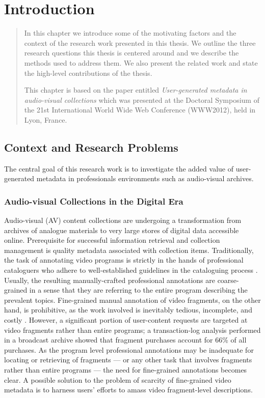 \chapter{Introduction}\label{chap:intro}

\begin{quotation}
\noindent 
In this chapter we introduce some of the motivating factors and the context of the research work presented in this thesis. We outline the three research questions this thesis is centered around and we describe the methods used to address them. We also present the related work and state the high-level contributions of the thesis.

This chapter is based on the paper entitled \textit{User-generated metadata in audio-visual collections} which was presented at the Doctoral Symposium of the 21st International World Wide Web Conference (WWW2012), held in Lyon, France.
\end{quotation}

\section{Context and Research Problems}
The central goal of this research work is to investigate the added value of user-generated metadata in professionals environments such as audio-visual archives. 
\subsection{Audio-visual Collections in the Digital Era}
Audio-visual (AV) content collections are undergoing a transformation from archives of analogue materials to very large stores of digital data accessible online. Prerequisite for successful information retrieval and collection management is quality metadata associated with collection items. Traditionally, the task of annotating video programs is strictly in the hands of professional cataloguers who adhere to well-established guidelines in the cataloguing process \cite{acrchivingphilosophy}. Usually, the resulting manually-crafted professional annotations are coarse-grained in a sense that they are referring to the entire program describing the prevalent topics. Fine-grained manual annotation of video fragments, on the other hand, is prohibitive, as the work involved is inevitably tedious, incomplete, and costly \cite{bouke}. However, a significant portion of user-content requests are targeted at video fragments rather than entire programs; a transaction-log analysis \cite{fragmentpercent} performed in a broadcast archive showed that fragment purchases account for 66\% of all purchases. As the program level professional annotations may be inadequate for locating or retrieving of fragments --- or any other task that involves fragments rather than entire programs --- the need for fine-grained annotations becomes clear. A possible solution to the problem of scarcity of fine-grained
 video metadata is to harness users' efforts to amass video fragment-level descriptions.
 

